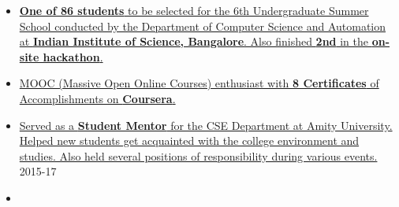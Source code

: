 \documentclass[10pt,a4paper]{article}
\begin{document}
\spacedhrule{0.5em}{-0.4em}

\vspace{0.15cm}
\begin{itemize}[labelindent=1.5em,labelsep=-0.3cm,leftmargin=*]

\item \headedsubsection 
{\href{}{\normalfont \textbf{One of 86 students} to be selected for the 6th Undergraduate Summer School conducted by the Department of Computer Science and Automation at
\textbf{Indian Institute of Science, Bangalore}. Also finished \textbf{2nd} in the \textbf{on-site hackathon}. 
}}{{{}}}


\item \headedsubsection 
{\href{}{\normalfont MOOC (Massive Open Online Courses) enthusiast with \textbf{8 Certificates} of Accomplishments on \textbf{Coursera}.
}}{{{}}}

\item \headedsubsection 
{\href{}{\normalfont Served as a \textbf{Student Mentor} for the CSE Department at Amity University. Helped new students get acquainted with the college environment and studies. Also held several positions of responsibility during various events.
}}{{{ 2015-17}}}

\item {}

\end{itemize}
\end{document}
